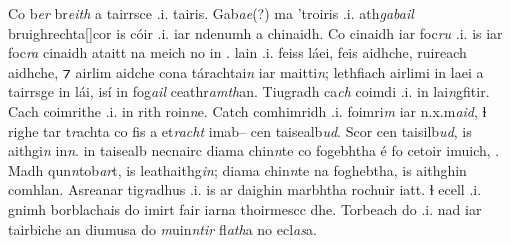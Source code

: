 \documentclass[11pt]{article}
\begin{document}
\begin{pages}
  \Pages

  \begin{Leftside}
    \beginnumbering
    \pstart
    Co b\emph{er} br\emph{eith} a tairrsce .i.  tairis.  Gab\emph{ae}(?) ma 'troiris .i. ath\emph{gabail} bruighrechta[\hspace{2mm}]cor is c\'{o}ir .i. iar ndenumh a chinaidh.  Co cinaidh iar foc\emph{ru} .i. is iar foc\emph{ra} cinaidh ataitt na meich no in .   lain .i. feiss l\'{a}ei, feis aidhche, ruireach aidhche, ⁊ airlim aidche cona t\'{a}rachtai\emph{n} iar maitti\emph{n}; lethfiach airlimi in laei a tairrsge in l\'{a}i, is\'{i} in fog\emph{ail} ceathr\emph{amth}an.  Tiugradh  ca\emph{ch} coimdi .i. in lai\emph{n}gfitir.  Cach coimrithe .i. in rith roin\emph{n}e.  Catch comhimridh .i. foimri\emph{m} iar n.x.m\emph{aid}, ɫ righe tar t\emph{r}achta co fis a et\emph{racht} imab-- cen taisealb\emph{ud}.  Scor cen taisilb\emph{ud}, is aithgi\emph{n} in\emph{n}.  in taisealb necnairc diama chin\emph{n}te co fogebhtha \'{e} fo cetoir imuich, .  Madh qun\emph{n}tob\emph{ar}t, is leathaithg\emph{in}; diama chin\emph{n}te na foghebtha, is aithghin comhlan.  Asreanar tig\emph{r}adhus .i. is ar daighin marbhtha rochuir iatt. ɫ ecell .i. gnimh borblachais do imirt fair iarna thoirmescc dhe. Torbeach do  .i. nad iar tairbiche an diumusa do \emph{m}uin\emph{ntir} fl\emph{ath}a no ecl\emph{as}a. 
    \pend
  \endnumbering
  \end{Leftside}


\end{pages}
\end{document}

